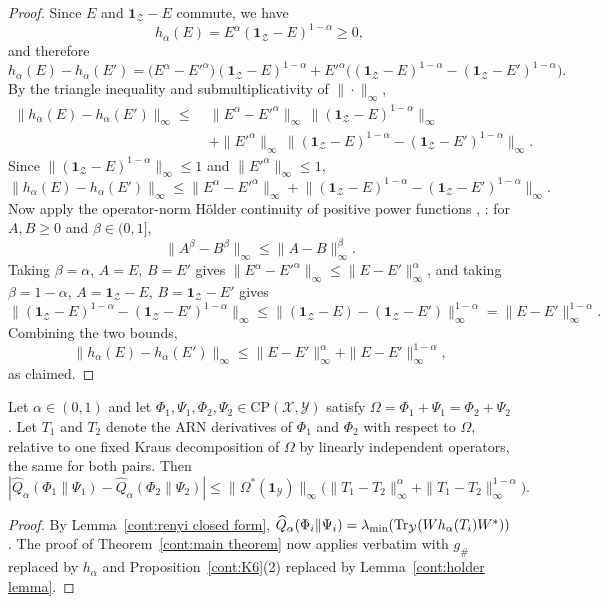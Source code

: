 \begin{proof}
    Since $E$ and $\mathbf{1}_{\mathcal{Z}}-E$ commute, we have
    \[
        h_\alpha(E) = E^{\alpha}(\mathbf{1}_{\mathcal{Z}}-E)^{1-\alpha} \geq 0,
    \]
    and therefore
    \[
        h_\alpha(E)-h_\alpha(E') = \big(E^{\alpha}-E'^{\alpha}\big)(\mathbf{1}_{\mathcal{Z}}-E)^{1-\alpha} + E'^{\alpha}\Big((\mathbf{1}_{\mathcal{Z}}-E)^{1-\alpha}-(\mathbf{1}_{\mathcal{Z}}-E')^{1-\alpha}\Big).
    \]
    By the triangle inequality and submultiplicativity of $\|\cdot\|_\infty$,
    \begin{align*}
        \|h_\alpha(E)-h_\alpha(E')\|_\infty \leq\;& \|E^{\alpha}-E'^{\alpha}\|_\infty\,\|(\mathbf{1}_{\mathcal{Z}}-E)^{1-\alpha}\|_\infty \\
        &+ \|E'^{\alpha}\|_\infty\,\big\|(\mathbf{1}_{\mathcal{Z}}-E)^{1-\alpha}-(\mathbf{1}_{\mathcal{Z}}-E')^{1-\alpha}\big\|_\infty.
    \end{align*}
    Since $\|(\mathbf{1}_{\mathcal{Z}}-E)^{1-\alpha}\|_\infty\leq 1$ and $\|E'^{\alpha}\|_\infty\leq 1$,
    \[
        \|h_\alpha(E)-h_\alpha(E')\|_\infty \leq \|E^{\alpha}-E'^{\alpha}\|_\infty + \big\|(\mathbf{1}_{\mathcal{Z}}-E)^{1-\alpha}-(\mathbf{1}_{\mathcal{Z}}-E')^{1-\alpha}\big\|_\infty.
    \]
    Now apply the operator-norm H\"older continuity of positive power functions \cite{Ando1988}, \cite[Theorem~X.1.1]{bhatia1997matrix}: for $A,B\geq 0$ and $\beta\in(0,1]$,
    \[
        \|A^\beta - B^\beta\|_\infty \leq \|A-B\|_\infty^\beta.
    \]
    Taking $\beta=\alpha$, $A=E$, $B=E'$ gives $\|E^{\alpha}-E'^{\alpha}\|_\infty \leq \|E-E'\|_\infty^{\alpha}$, and taking $\beta=1-\alpha$, $A=\mathbf{1}_{\mathcal{Z}}-E$, $B=\mathbf{1}_{\mathcal{Z}}-E'$ gives
    \[
        \big\|(\mathbf{1}_{\mathcal{Z}}-E)^{1-\alpha}-(\mathbf{1}_{\mathcal{Z}}-E')^{1-\alpha}\big\|_\infty \leq \|(\mathbf{1}_{\mathcal{Z}}-E)-(\mathbf{1}_{\mathcal{Z}}-E')\|_\infty^{1-\alpha} = \|E-E'\|_\infty^{1-\alpha}.
    \]
    Combining the two bounds,
    \[
        \|h_\alpha(E)-h_\alpha(E')\|_\infty \leq \|E-E'\|_\infty^{\alpha}+\|E-E'\|_\infty^{1-\alpha},
    \]
    as claimed.
\end{proof}
\begin{theorem}\label{cont:thm:renyi continuity}
    Let $\alpha\in(0,1)$ and let $\Phi_1,\Psi_1,\Phi_2,\Psi_2\in \mathrm{CP}(\mathcal{X},\mathcal{Y})$ satisfy $\Omega=\Phi_1+\Psi_1=\Phi_2+\Psi_2$. Let $T_1$ and $T_2$ denote the ARN derivatives of $\Phi_1$ and $\Phi_2$ with respect to $\Omega$, relative to one fixed Kraus decomposition of $\Omega$ by linearly independent operators, the same for both pairs. Then
    \[
        |\widehat{Q}_\alpha(\Phi_1\|\Psi_1)-\widehat{Q}_\alpha(\Phi_2\|\Psi_2)|\leq \|\Omega^*(\mathbf{1}_{\mathcal{Y}})\|_\infty\big(\|T_1-T_2\|_\infty^\alpha+\|T_1-T_2\|_\infty^{1-\alpha}\big).
    \]
\end{theorem}
    \begin{proof}
        By Lemma~\ref{cont:renyi closed form}, $\widehat{Q}_\alpha(\Phi_i\|\Psi_i)=\lambda_{\min}(\operatorname{Tr}_{\mathcal{Y}}(Wh_\alpha(T_i)W^*))$. The proof of Theorem~\ref{cont:main theorem} now applies verbatim with $g_\#$ replaced by $h_\alpha$ and Proposition~\ref{cont:K6}(2) replaced by Lemma~\ref{cont:holder lemma}. 
    \end{proof}
